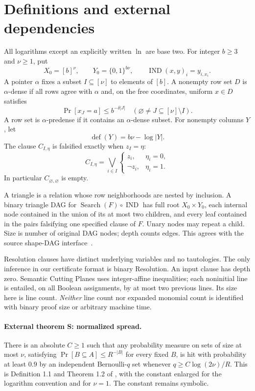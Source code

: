 \documentclass[11pt]{article}
\newcommand{\IND}{\operatorname{IND}}
\begin{document}
\section{Definitions and external dependencies}
All logarithms except an explicitly written $\ln$ are base two. For integer
$b\ge3$ and $\nu\ge1$, put
\[
 X_0=[b]^\nu,\qquad Y_0=\{0,1\}^{b\nu},\qquad
 \IND(x,y)_i=y_{i,x_i}.
\]
A pointer $\alpha$ fixes a subset $I\subseteq[\nu]$ to elements of $[b]$.
A nonempty row set $D$ is $\alpha$-dense if all rows agree with $\alpha$
and, on the free coordinates, uniform $x\in D$ satisfies
\[
 \Pr[x_J=a]\le b^{-\delta|J|}
 \quad(\varnothing\ne J\subseteq[\nu]\setminus I).        \tag{2}
\]
A row set is $\alpha$-predense if it contains an $\alpha$-dense subset.
For nonempty columns $Y$, let
\[
 \operatorname{def}(Y)=b\nu-\log|Y|.
\]
The clause $C_{I,\eta}$ is falsified exactly when $z_I=\eta$:
\[
 C_{I,\eta}=\bigvee_{i\in I}\begin{cases}z_i,&\eta_i=0,\\
                                     \neg z_i,&\eta_i=1.\end{cases}
\]
In particular $C_{\varnothing,\varnothing}$ is empty.

A triangle is a relation whose row neighborhoods are nested by inclusion.
A binary triangle DAG for $\operatorname{Search}(F)\circ\IND$ has full root
$X_0\times Y_0$, each internal node contained in the union of its at most
two children, and every leaf contained in the pairs falsifying one specified
clause of $F$. Unary nodes may repeat a child. Size is number of original
DAG nodes; depth counts edges. This agrees with the source shape-DAG
interface~\cite[Section 2.6]{tradeoff}.

Resolution clauses have distinct underlying variables and no tautologies.
The only inference in our certificate format is binary Resolution. An input
clause has depth zero. Semantic Cutting Planes uses integer-affine
inequalities; each noninitial line is entailed, on all Boolean assignments,
by at most two previous lines. Its size here is line count. \emph{Neither}
line count nor expanded monomial count is identified with binary proof size
or arbitrary machine time.

\paragraph{External theorem S: normalized spread.}
There is an absolute $C\ge1$ such that any probability measure on sets of
size at most $\nu$, satisfying
$\Pr[B\subseteq A]\le R^{-|B|}$ for every fixed $B$, is hit with probability
at least $0.9$ by an independent Bernoulli-$q$ set whenever
$q\ge C\log(2\nu)/R$. This is Definition 1.1 and Theorem 1.2 of
\cite{spread}, with the constant enlarged for the logarithm convention and
for $\nu=1$. The constant remains symbolic.
\end{document}
